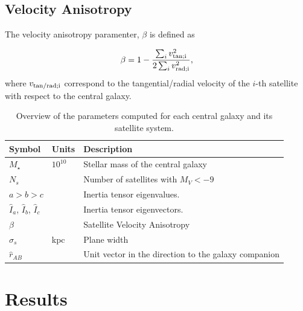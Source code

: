 \documentclass[a4paper,fleqn,usenatbib]{mnras}
\newcommand{\Msun}{{\ifmmode{{\rm{M_{\odot}}}}\else{${\rm{M_{\odot}}}$}\fi}}
\begin{document}
\subsection{Velocity Anisotropy}
\label{sub:beta}

The velocity anisotropy paramenter, $\beta$ is defined as

\begin{equation}
  \beta = 1 - \frac{\sum_i v^2_{\rm{tan}; i}}{2\sum_i v^{2}_{\rm{rad};i}},
\label{eq:beta}
\end{equation}
% 
where $v_{\rm{tan/rad};i}$ correspond to the tangential/radial
velocity of the $i$-th satellite with respect to the central galaxy.



\begin{table}
  \centering
\begin{tabular}{lll}
\hline\hline
Symbol & Units & Description\\\hline
$M_{\star}$ & $10^{10}$\Msun & Stellar mass of the central galaxy\\
$N_s$ & & Number of satellites with $M_V<-9$\\
$a > b> c$ & & Inertia tensor eigenvalues. \\
$\hat{I}_a$, $\hat{I}_b$, $\hat{I}_c$ & & Inertia tensor eigenvectors. \\
$\beta$  &  & Satellite Velocity Anisotropy\\
$\sigma_s$ & kpc & Plane width\\
$\hat{r}_{AB}$& & Unit vector in the direction to the galaxy companion\\
\hline\hline
\end{tabular}
  \caption{Overview of the parameters computed for each central galaxy
    and its satellite system.
  \label{tab:models}}
\end{table}


\section{Results}
\label{sec:results}
\end{document}
